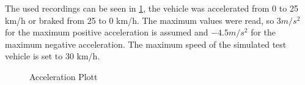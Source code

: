 \documentclass[11pt,oneside,openright]{mpreport}
\begin{document}
The used recordings can be seen in \cref{max_accel}, the vehicle was accelerated from 0 to 25 km/h or braked from 25 to 0 km/h.
The maximum values were read, so $ 3m/{s^2} $ for the maximum positive acceleration is assumed and $ -4.5m/{s ^ 2} $ for the maximum negative acceleration.
The maximum speed of the simulated test vehicle is set to 30 km/h.



\begin{figure}[!ht]
\caption{Acceleration Plott}
\begin{center}
\label{max_accel}
\end{center}
\end{figure}

\end{document}
